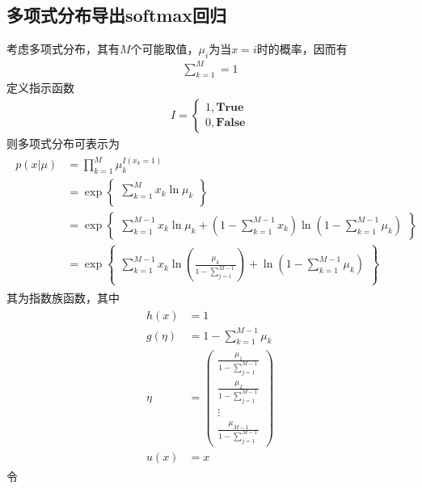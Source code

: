 \subsection{多项式分布导出softmax回归}
考虑多项式分布，其有$M$个可能取值，$\mu_i$为当$x=i$时的概率，因而有
\begin{eqnarray}
\sum_{k=1}^M=1
\end{eqnarray}
定义指示函数
\begin{eqnarray}
I=
\left\lbrace
\begin{aligned}
1,\textbf{True}\\
0,\textbf{False}
\end{aligned}
\right.
\end{eqnarray}
则多项式分布可表示为
\begin{eqnarray}
\begin{aligned}
p(x|\mu) &= \prod_{k=1}^M\mu_k^{I(x_k=1)}\\
&= \exp
	\left\lbrace
	\begin{aligned}
	{\sum_{k=1}^Mx_k\ln\mu_k}\\
	\end{aligned}
	\right\rbrace\\
&= \exp
	\left\lbrace
	\begin{aligned}
	{\sum_{k=1}^{M-1}x_k\ln\mu_k+(1-\sum_{k=1}^{M-1}x_k)\ln(1-\sum_{k=1}^{M-1}\mu_k)}
	\end{aligned}
	\right\rbrace\\
&= \exp
	\left\lbrace
	\begin{aligned}
	\sum_{k=1}^{M-1}x_k\ln(\frac{\mu_k}{1-\sum_{j=1}^{M-1}})+\ln(1-\sum_{k=1}^{M-1}\mu_k)
	\end{aligned}
	\right\rbrace
\end{aligned}
\end{eqnarray}
其为指数族函数，其中
\begin{eqnarray}
\begin{aligned}
h(x)&=1\\
g(\eta)&=1-\sum_{k=1}^{M-1}\mu_k\\
\eta &= 
\begin{pmatrix}
\frac{\mu_1}{1-\sum_{j=1}^{M-1}}\\
\frac{\mu_2}{1-\sum_{j=1}^{M-1}}\\
\vdots\\
\frac{\mu_{M-1}}{1-\sum_{j=1}^{M-1}}
\end{pmatrix}\\
u(x)&=x
\end{aligned}
\end{eqnarray}
令
